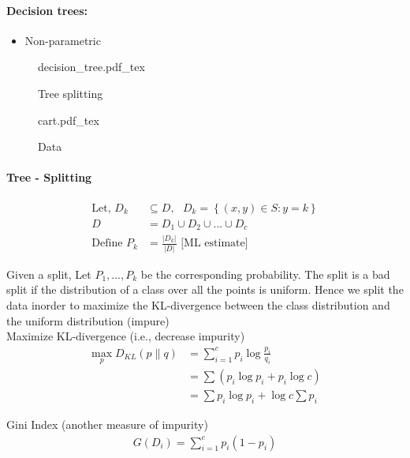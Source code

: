 \documentclass[11pt]{article}
\begin{document}
\paragraph{Decision trees:}
\begin{itemize}
\item Non-parametric
\end{itemize}

\begin{figure}
  \centering
  \begin{minipage}{0.5\textwidth}
    \centering
    \def\svgwidth{\columnwidth}
    {decision_tree.pdf_tex}
    \caption{Tree splitting}
    \label{fig:decision_tree}
  \end{minipage}%
  \begin{minipage}{0.5\textwidth}
    \centering
    \def\svgwidth{\columnwidth}
    {cart.pdf_tex}
    \caption{Data}
    \label{fig:cart}
  \end{minipage}
\end{figure}

\paragraph{Tree - Splitting}

\begin{align*}
\text{Let, } D_k &\subseteq D, \text{ } D_k = \left\{ (x, y) \in S: y = k \right\} \\
  D &= D_1 \cup D_2 \cup ... \cup D_c \\
  \text{Define } P_k &= \frac{|D_k|}{|D|} \text{  [ML estimate]}
\end{align*}

Given a split, Let $P_1, ..., P_k$ be the corresponding probability.
The split is a bad split if the distribution of a class over all the points is uniform. Hence we split the data inorder to maximize the KL-divergence between the class distribution and the uniform distribution (impure) \\

Maximize KL-divergence (i.e., decrease impurity)
\begin{align*}
  \max_p D_{KL}(p \parallel q) &= \sum_{i=1}^c p_i \log \frac{p_i}{q_i} \\
                        &= \sum \left( p_i \log p_i + p_i \log c \right) \\
  &= \sum p_i \log p_i + \log c\sum p_i
\end{align*}

Gini Index (another measure of impurity)
\begin{align*}
G(D_i) = \sum_{i=1}^c p_i(1 - p_i)
\end{align*}
\end{document}

